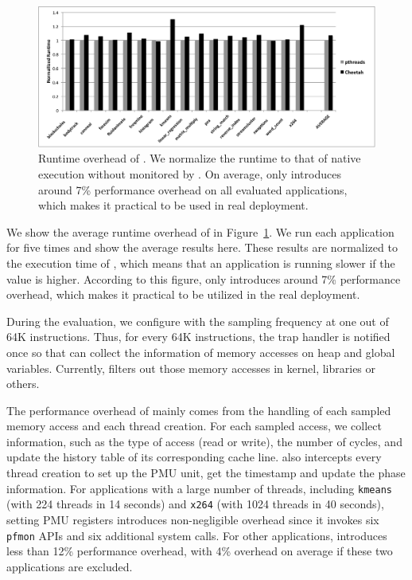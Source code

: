 \begin{figure}[htbp]
\centering
\includegraphics[width=2\columnwidth]{figure/Overhead.pdf}
\caption{Runtime overhead of \Cheetah{}. We normalize the runtime to that of native execution without monitored by \Cheetah{}. On average, \cheetah{} only introduces around 7\% performance overhead on all evaluated applications, which makes it practical to be used in real deployment. \label{fig:overhead}}
\end{figure}

We show the average runtime overhead of \cheetah{} in Figure~\ref{fig:overhead}. We run each application for five times and show the average results here. These results are normalized to the execution time of \pthreads{}, which means that an application is running slower if the value is higher.  According to this figure, \cheetah{} only introduces around 7\% performance overhead, which makes it practical to be utilized in the real deployment. 

During the evaluation, we configure \cheetah{} with the sampling frequency at one out of 64K instructions. Thus, for every 64K instructions, the trap handler is notified once so that \cheetah{} can collect the information of memory accesses on heap and global variables. Currently, \Cheetah{} filters out those memory accesses in kernel, libraries or others. 

The performance overhead of \cheetah{} mainly comes from the handling of each sampled memory access and each thread creation. For each sampled access, we collect information, such as the type of access (read or write), the number of cycles, and update  the history table of its corresponding cache line. \cheetah{} also intercepts every thread creation to set up the PMU unit, get the timestamp and update the phase information. For applications with a large number of threads, including \texttt{kmeans} (with 224 threads in 14 seconds) and \texttt{x264} (with 1024 threads in 40 seconds), setting PMU registers introduces non-negligible overhead since it invokes six \texttt{pfmon} APIs and six additional system calls. For other applications, \cheetah{} introduces less than 12\% performance overhead, with 4\% overhead on average if these two applications are excluded.  

